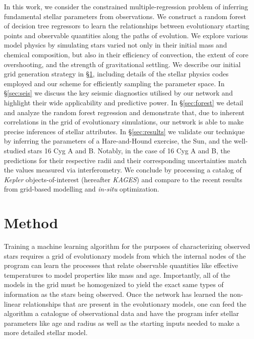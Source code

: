 \documentclass[manuscript]{aastex}
\begin{document}
In this work, we consider the constrained multiple-regression problem of inferring fundamental stellar parameters from observations. We construct a random forest of decision tree regressors to learn the relationships between evolutionary starting points and observable quantities along the paths of evolution. We explore various model physics by simulating stars varied not only in their initial mass and chemical composition, but also in their efficiency of convection, the extent of core overshooting, and the strength of gravitational settling. We describe our initial grid generation strategy in \S \ref{sec:Method}, including details of the stellar physics codes employed and our scheme for efficiently sampling the parameter space. In \S \ref{sec:seis} we discuss the key seismic diagnostics utilised by our network and highlight their wide applicability and predictive power. In \S \ref{sec:forest} we detail and analyze the random forest regression and demonstrate that, due to inherent correlations in the grid of evolutionary simulations, our network is able to make precise inferences of stellar attributes. In \S \ref{sec:results} we validate our technique by inferring the parameters of a Hare-and-Hound exercise, the Sun, and the well-studied stars 16 Cyg A and B. Notably, in the case of 16 Cyg A and B, the predictions for their respective radii and their corresponding uncertainties match the values measured via interferometry. We conclude by processing a catalog of \emph{Kepler} objects-of-interest (hereafter \emph{KAGES}) and compare to the recent results from grid-based modelling and \emph{in-situ} optimization. 

\section{Method} \label{sec:Method} 
Training a machine learning algorithm for the purposes of characterizing observed stars requires a grid of evolutionary models from which the internal nodes of the program can learn the processes that relate observable quantities like effective temperatures to model properties like mass and age. Importantly, all of the models in the grid must be homogenized to yield the exact same types of information as the stars being observed. Once the network has learned the non-linear relationships that are present in the evolutionary models, one can feed the algorithm a catalogue of observational data and have the program infer stellar parameters like age and radius as well as the starting inputs needed to make a more detailed stellar model. 
\end{document}
